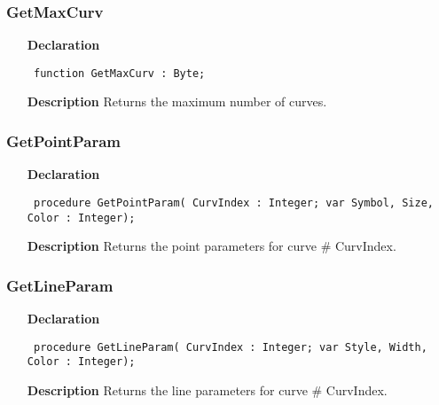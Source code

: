 \documentclass[12pt,a4paper,oneside]{report}
\newcommand{\declarationitem}[1]{\textbf{#1}}
\newcommand{\descriptiontitle}[1]{\textbf{#1}}
\newcommand{\code}[1]{\texttt{#1}}
\begin{document}
\subsubsection{GetMaxCurv}
\label{uplot-GetMaxCurv}
\begin{itemize}\item[\declarationitem{Declaration}\hfill]
	\begin{flushleft}
		\code{
			function GetMaxCurv : Byte;}
		
	\end{flushleft}
	
	\par
	\item[\descriptiontitle{Description}]
	Returns the maximum number of curves.
	
\end{itemize}
\subsubsection{GetPointParam}
\label{uplot-GetPointParam}
\begin{itemize}\item[\declarationitem{Declaration}\hfill]
	\begin{flushleft}
		\code{
			procedure GetPointParam( CurvIndex : Integer; var Symbol, Size, Color : Integer);}
		
	\end{flushleft}
	
	\par
	\item[\descriptiontitle{Description}]
	Returns the point parameters for curve {\#} CurvIndex.
	
\end{itemize}
\subsubsection{GetLineParam}
\label{uplot-GetLineParam}
\begin{itemize}\item[\declarationitem{Declaration}\hfill]
	\begin{flushleft}
		\code{
			procedure GetLineParam( CurvIndex : Integer; var Style, Width, Color : Integer);}
		
	\end{flushleft}
	
	\par
	\item[\descriptiontitle{Description}]
	Returns the line parameters for curve {\#} CurvIndex.
	
\end{itemize}
\end{document}
